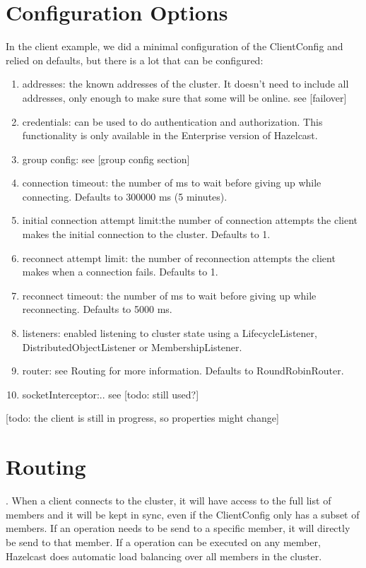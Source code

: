 \section{Configuration Options}
In the client example, we did a minimal configuration of the ClientConfig and relied on defaults, but there is a lot that can be configured:
\begin{enumerate}
\item addresses: the known addresses of the cluster. It doesn't need to include all addresses, only enough to make sure that some will be online. see [failover]
\item credentials: can be used to do authentication and authorization. This functionality is only available in the Enterprise version of Hazelcast.
\item group config: see [group config section]
\item connection timeout: the number of ms to wait before giving up while connecting. Defaults to 300000 ms (5 minutes).
\item initial connection attempt limit:the  number of connection attempts the client makes the initial connection to the cluster. Defaults to 1.
\item reconnect attempt limit: the number of reconnection attempts the client makes when a connection fails. Defaults to 1.
\item reconnect timeout: the number of ms to wait before giving up while reconnecting. Defaults to 5000 ms.
\item listeners: enabled listening to cluster state using a LifecycleListener, DistributedObjectListener or MembershipListener.
\item router: see Routing for more information. Defaults to RoundRobinRouter.
\item socketInterceptor:.. see [todo: still used?]
\end{enumerate}
[todo: the client is still in progress, so properties might change]

\section{Routing}.
When a client connects to the cluster, it will have access to the full list of members and it will be kept in sync, even if the ClientConfig only has a subset of members. If an operation needs to be send to a specific member, it will directly be send to that member. If a operation can be executed on any member, Hazelcast does automatic load balancing over all members in the cluster. 

